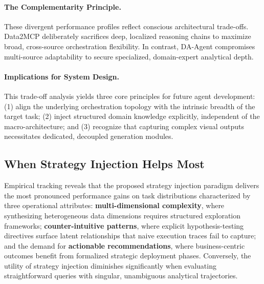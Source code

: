 \paragraph{The Complementarity Principle.}
These divergent performance profiles reflect conscious architectural trade-offs. Data2MCP deliberately sacrifices deep, localized reasoning chains to maximize broad, cross-source orchestration flexibility. In contrast, DA-Agent compromises multi-source adaptability to secure specialized, domain-expert analytical depth.

\paragraph{Implications for System Design.}
This trade-off analysis yields three core principles for future agent development: (1) align the underlying orchestration topology with the intrinsic breadth of the target task; (2) inject structured domain knowledge explicitly, independent of the macro-architecture; and (3) recognize that capturing complex visual outputs necessitates dedicated, decoupled generation modules.

\subsection{When Strategy Injection Helps Most}

Empirical tracking reveals that the proposed strategy injection paradigm delivers the most pronounced performance gains on task distributions characterized by three operational attributes: \textbf{multi-dimensional complexity}, where synthesizing heterogeneous data dimensions requires structured exploration frameworks; \textbf{counter-intuitive patterns}, where explicit hypothesis-testing directives surface latent relationships that naive execution traces fail to capture; and the demand for \textbf{actionable recommendations}, where business-centric outcomes benefit from formalized strategic deployment phases. Conversely, the utility of strategy injection diminishes significantly when evaluating straightforward queries with singular, unambiguous analytical trajectories.
